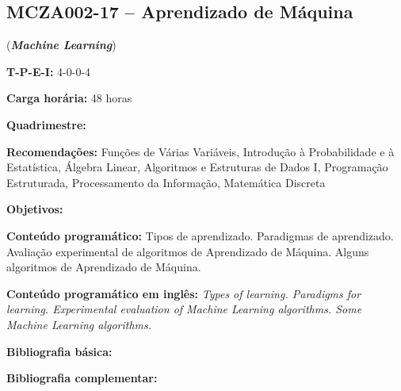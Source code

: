 \documentclass[class=article, crop=false]{standalone}
\begin{document}
\subsection*{MCZA002-17 -- Aprendizado de Máquina}
\label{disc:ia}

(\textbf{\textit{Machine Learning}})

\begin{center}
    \begin{minipage}{0.85\textwidth}
        \textbf{T-P-E-I:} 4-0-0-4
        
        \textbf{Carga horária:} 48 horas
        
        \textbf{Quadrimestre:}
        
        \textbf{Recomendações:}
        Funções de Várias Variáveis,
        Introdução à Probabilidade e à Estatística,
        Álgebra Linear,
        Algoritmos e Estruturas de Dados I,
        Programação Estruturada,
        Processamento da Informação,
        Matemática Discreta
    \end{minipage}
\end{center}

\textbf{Objetivos:}

\textbf{Conteúdo programático:}
Tipos de aprendizado. Paradigmas de aprendizado. Avaliação experimental de algoritmos de Aprendizado de Máquina. Alguns algoritmos de Aprendizado de Máquina.

\textbf{Conteúdo programático em inglês:}
\textit{Types of learning. Paradigms for learning. Experimental evaluation of Machine Learning algorithms. Some Machine Learning algorithms.}

\newrefsection
\textbf{Bibliografia básica:}
\nocite{alpaydin,bishop,mitchell}
\printbibliography

\newrefsection
\textbf{Bibliografia complementar:}
\nocite{bittencourt,brachman,goldberg,luger,wooldridge}
\printbibliography
\end{document}

